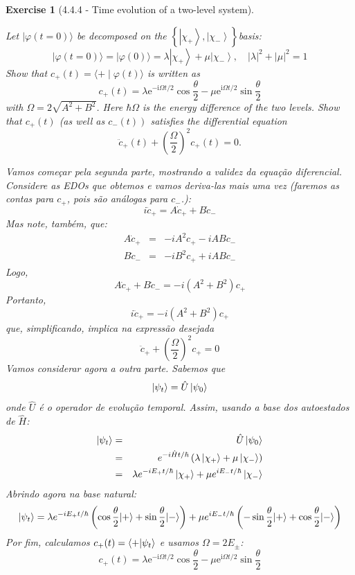 \documentclass[12pt]{article}
\def\be{\begin{equation}}
\def\ee{\end{equation}}
\def\bea{\begin{eqnarray*}}
\def\eea{\end{eqnarray*}}
\def\f{\frac}
\def\l{\left}
\def\r{\right}
\newtheorem{exercise}{Exercise}
\begin{document}
\begin{exercise}[4.4.4 - Time evolution of a two-level system]
\begin{exercises}
		\item Let $|\varphi(t=0)\rangle$ be decomposed on the $\left\{\left|\chi_{+}\right\rangle,\left|\chi_{-}\right\rangle\right\}$basis:
		$$
		|\varphi(t=0)\rangle=|\varphi(0)\rangle=\lambda\left|\chi_{+}\right\rangle+\mu\left|\chi_{-}\right\rangle, \quad|\lambda|^{2}+|\mu|^{2}=1
		$$
		Show that $c_{+}(t)=\langle+\mid \varphi(t)\rangle$ is written as
		$$
		c_{+}(t)=\lambda \mathrm{e}^{-\mathrm{i} \Omega t / 2} \cos \frac{\theta}{2}-\mu \mathrm{e}^{\mathrm{i} \Omega t / 2} \sin \frac{\theta}{2}
		$$
		with $\Omega=2 \sqrt{A^{2}+B^{2}}$. Here $\hbar \Omega$ is the energy difference of the two levels. Show that $c_{+}(t)$ (as well as $\left.c_{-}(t)\right)$ satisfies the differential equation
		$$
		\ddot{c}_{+}(t)+\left(\frac{\Omega}{2}\right)^{2} c_{+}(t)=0 .
		$$
		\begin{multianswer}
			Vamos começar pela segunda parte, mostrando a validez da equação diferencial. Considere as EDOs que obtemos e vamos deriva-las mais uma vez (faremos as contas para $c_+$, pois são análogas para $c_-$.):
			\be
				i\ddot{c}_+ = A\dot{c}_+ + B\dot{c}_-
			\ee
			Mas note, também, que:
			\bea
				A\dot{c}_+ &=& -iA^2c_+ - iABc_- \\
				B\dot{c}_- &=& -iB^2c_+ + iABc_-
			\eea
			Logo, 
			\be
				A\dot{c}_+ + B\dot{c}_- = -i(A^2+B^2)c_+
			\ee
			Portanto,
			\be
				i\ddot{c}_+ = -i(A^2+B^2)c_+
			\ee
			que, simplificando, implica na expressão desejada
			\be
				\ddot{c}_+ +\l(\f{\Omega}{2}\r)^2c_+ = 0
			\ee
			Vamos considerar agora a outra parte. Sabemos que
			\be
				\ket{\psi_t} = \hat{U}\ket{\psi_0}
			\ee
			onde $\hat{U}$ é o operador de evolução temporal. Assim, usando a base dos autoestados de $\hat{H}$:
			\bea
				\ket{\psi_t} &=& \hat{U}\ket{\psi_0} \\
							&=& e^{-i\hat{H}t/\hbar} \l(\lambda\left|\chi_{+}\right\rangle+\mu\left|\chi_{-}\right\rangle\r) \\
							&=& \lambda e^{-iE_+t/\hbar}\ket{\chi_+} + \mu e^{iE_-t/\hbar}\ket{\chi_-}
			\eea
			Abrindo agora na base natural:
			\be
				\ket{\psi_t} = \lambda e^{-iE_+t/\hbar}\l(\cos \frac{\theta}{2}|+\rangle+\sin \frac{\theta}{2}|-\rangle\r) + \mu e^{iE_-t/\hbar}\l(-\sin \frac{\theta}{2}|+\rangle+\cos \frac{\theta}{2}|-\rangle\r)
			\ee
			Por fim, calculamos $c_+(t) = \braket{+|\psi_t}$ e usamos $\Omega = 2E_\pm$:
			\be
				c_+(t) = \lambda \mathrm{e}^{-\mathrm{i} \Omega t / 2} \cos \frac{\theta}{2}-\mu \mathrm{e}^{\mathrm{i} \Omega t / 2} \sin \frac{\theta}{2}
			\ee
			

\end{multianswer}
\end{exercises}
\end{exercise}
\end{document}
